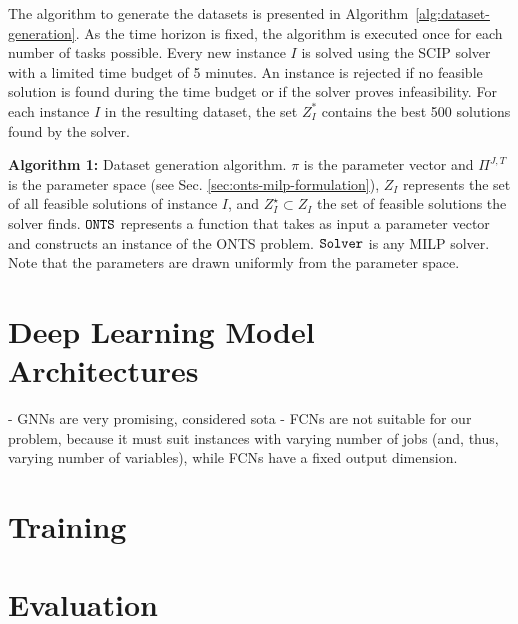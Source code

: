 The algorithm to generate the datasets is presented in Algorithm~\ref{alg:dataset-generation}.
As the time horizon is fixed, the algorithm is executed once for each number of tasks possible.
Every new instance $I$ is solved using the SCIP solver~\cite{bestuzhevaSCIPOptimizationSuite2021} with a limited time budget of 5 minutes.
An instance is rejected if no feasible solution is found during the time budget or if the solver proves infeasibility.
For each instance $I$ in the resulting dataset, the set $Z^*_I$ contains the best 500 solutions found by the solver.

\begin{algorithm}[h]
    \NoCaptionOfAlgo
    \SetAlgoLined
    
    \caption{\textbf{Algorithm 1:} Dataset generation algorithm. $\pi$ is the parameter vector and $\Pi^{J,T}$ is the parameter space (see Sec. \ref{sec:onts-milp-formulation}), $Z_I$ represents the set of all feasible solutions of instance $I$, and $Z_I^\star \subset Z_I$ the set of feasible solutions the solver finds.
    ${\tt ONTS}$ represents a function that takes as input a parameter vector and constructs an instance of the ONTS problem.
    ${\tt Solver}$ is any MILP solver.
    Note that the parameters are drawn uniformly from the parameter space.
    }\label{alg:dataset-generation}
\end{algorithm}


\section{Deep Learning Model Architectures}

- GNNs are very promising, considered sota
- FCNs are not suitable for our problem, because it must suit instances with varying number of jobs (and, thus, varying number of variables), while FCNs have a fixed output dimension.

\section{Training}

\section{Evaluation}

